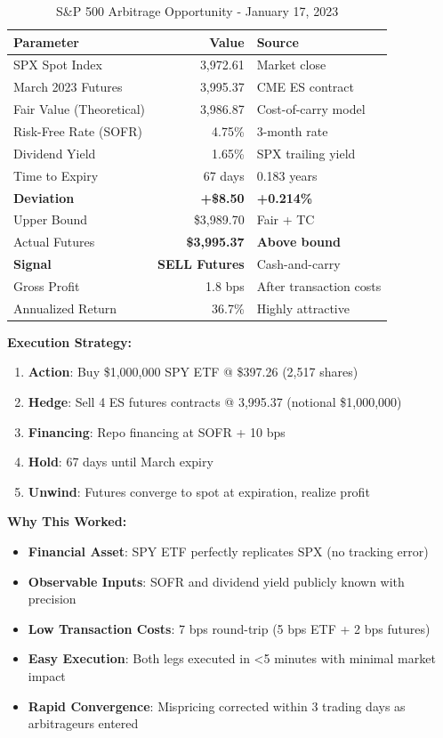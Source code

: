 \documentclass[12pt,a4paper]{article}
\begin{document}
\begin{table}[H]
\centering
\caption{S\&P 500 Arbitrage Opportunity - January 17, 2023}
\label{tab:case_sp500}
\begin{tabular}{@{}lrl@{}}
\toprule
\textbf{Parameter} & \textbf{Value} & \textbf{Source} \\
\midrule
SPX Spot Index & 3,972.61 & Market close \\
March 2023 Futures & 3,995.37 & CME ES contract \\
Fair Value (Theoretical) & 3,986.87 & Cost-of-carry model \\
\midrule
Risk-Free Rate (SOFR) & 4.75\% & 3-month rate \\
Dividend Yield & 1.65\% & SPX trailing yield \\
Time to Expiry & 67 days & 0.183 years \\
\midrule
\textbf{Deviation} & \textbf{+\$8.50} & \textbf{+0.214\%} \\
Upper Bound & \$3,989.70 & Fair + TC \\
Actual Futures & \textbf{\$3,995.37} & \textbf{Above bound} \\
\midrule
\textbf{Signal} & \textbf{SELL Futures} & Cash-and-carry \\
Gross Profit & 1.8 bps & After transaction costs \\
Annualized Return & 36.7\% & Highly attractive \\
\bottomrule
\end{tabular}
\end{table}

\textbf{Execution Strategy:}

\begin{enumerate}
    \item \textbf{Action}: Buy \$1,000,000 SPY ETF @ \$397.26 (2,517 shares)
    \item \textbf{Hedge}: Sell 4 ES futures contracts @ 3,995.37 (notional \$1,000,000)
    \item \textbf{Financing}: Repo financing at SOFR + 10 bps
    \item \textbf{Hold}: 67 days until March expiry
    \item \textbf{Unwind}: Futures converge to spot at expiration, realize profit
\end{enumerate}

\textbf{Why This Worked:}

\begin{itemize}
    \item \textbf{Financial Asset}: SPY ETF perfectly replicates SPX (no tracking error)
    \item \textbf{Observable Inputs}: SOFR and dividend yield publicly known with precision
    \item \textbf{Low Transaction Costs}: 7 bps round-trip (5 bps ETF + 2 bps futures)
    \item \textbf{Easy Execution}: Both legs executed in <5 minutes with minimal market impact
    \item \textbf{Rapid Convergence}: Mispricing corrected within 3 trading days as arbitrageurs entered
\end{itemize}
\end{document}
